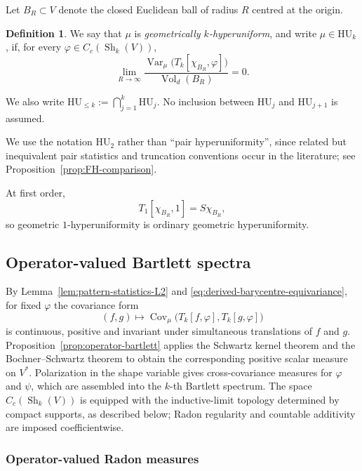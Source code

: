 \documentclass[11pt,reqno,a4paper]{amsart}
\numberwithin{equation}{section}
\theoremstyle{compact}
\theoremstyle{definition}
\newtheorem{definition}[definition]{Definition}
\theoremstyle{definition}
\newcommand{\HU}{\mathrm{HU}}
\newcommand{\Var}{\operatorname{Var}}
\newcommand{\Cov}{\operatorname{Cov}}
\newcommand{\Vol}{\operatorname{Vol}}
\newcommand{\Sh}{\operatorname{Sh}}
\begin{document}
Let $B_R\subset V$ denote the closed Euclidean ball of radius $R$ centred at the
origin.

\begin{definition}\label{def:geometric-k-hu}
We say that $\mu$ is \emph{geometrically $k$-hyperuniform}, and write
$\mu\in\HU_k$, if, for every $\varphi\in C_c(\Sh_k(V))$,
\begin{equation}\label{eq:geometric-k-hu}
  \lim_{R\to\infty}
  \frac{\Var_\mu\big(T_k[\chi_{B_R},\varphi]\big)}{\Vol_d(B_R)}=0.
\end{equation}
\end{definition}

We also write $\HU_{\leq k}:=\bigcap_{j=1}^k\HU_j$.  No inclusion between
$\HU_j$ and $\HU_{j+1}$ is assumed.

We use the notation $\HU_2$ rather than ``pair hyperuniformity'', since
related but inequivalent pair statistics and truncation conventions occur in
the literature; see Proposition~\ref{prop:FH-comparison}.

At first order,
\begin{equation}\label{eq:first-order-ball-statistic}
  T_1[\chi_{B_R},1]=S\chi_{B_R},
\end{equation}
so geometric $1$-hyperuniformity is ordinary geometric hyperuniformity.

\subsection{Operator-valued Bartlett spectra}
\label{subsec:bartlett}

By Lemma~\ref{lem:pattern-statistics-L2} and
\eqref{eq:derived-barycentre-equivariance}, for fixed $\varphi$ the covariance
form
\[
  (f,g)\longmapsto
  \Cov_\mu\bigl(T_k[f,\varphi],T_k[g,\varphi]\bigr)
\]
is continuous, positive and invariant under simultaneous translations of
$f$ and $g$.  Proposition~\ref{prop:operator-bartlett} applies the Schwartz
kernel theorem and the Bochner--Schwartz theorem to obtain the corresponding
positive scalar measure on $V^*$.  Polarization in the shape variable gives
cross-covariance measures for $\varphi$ and $\psi$, which are assembled
into the $k$-th Bartlett spectrum.  The space $C_c(\Sh_k(V))$ is equipped
with the inductive-limit topology determined by compact supports, as described
below; Radon regularity and countable additivity are imposed coefficientwise.

\subsubsection{Operator-valued Radon measures}
\end{document}
